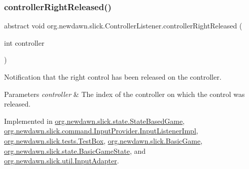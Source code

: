 \mbox{\label{interfaceorg_1_1newdawn_1_1slick_1_1_controller_listener_a33ee418e010e69783169b3f52fb62c3b}} 
\subsubsection{\texorpdfstring{controller\+Right\+Released()}{controllerRightReleased()}}
{\footnotesize\ttfamily abstract void org.\+newdawn.\+slick.\+Controller\+Listener.\+controller\+Right\+Released (\begin{DoxyParamCaption}\item[{int}]{controller }\end{DoxyParamCaption})\hspace{0.3cm}{\ttfamily [abstract]}}

Notification that the right control has been released on the controller.


\begin{DoxyParams}{Parameters}
{\em controller} & The index of the controller on which the control was released. \\
\hline
\end{DoxyParams}


Implemented in \mbox{\hyperlink{classorg_1_1newdawn_1_1slick_1_1state_1_1_state_based_game_a6bcf1a21902e2d05a6c8f7d14f575264}{org.\+newdawn.\+slick.\+state.\+State\+Based\+Game}}, \mbox{\hyperlink{classorg_1_1newdawn_1_1slick_1_1command_1_1_input_provider_1_1_input_listener_impl_a5703b6c8734b6d797edeecf4c3e27985}{org.\+newdawn.\+slick.\+command.\+Input\+Provider.\+Input\+Listener\+Impl}}, \mbox{\hyperlink{classorg_1_1newdawn_1_1slick_1_1tests_1_1_test_box_ac2e44af6fd71d4435f7d9ef1d2db582e}{org.\+newdawn.\+slick.\+tests.\+Test\+Box}}, \mbox{\hyperlink{classorg_1_1newdawn_1_1slick_1_1_basic_game_a84adeb6342b970209d965415b8d23162}{org.\+newdawn.\+slick.\+Basic\+Game}}, \mbox{\hyperlink{classorg_1_1newdawn_1_1slick_1_1state_1_1_basic_game_state_aeec0e8b46063fb631111a0e5f168cd01}{org.\+newdawn.\+slick.\+state.\+Basic\+Game\+State}}, and \mbox{\hyperlink{classorg_1_1newdawn_1_1slick_1_1util_1_1_input_adapter_ae2c91a34637c5d9af99d2098878b367e}{org.\+newdawn.\+slick.\+util.\+Input\+Adapter}}.

